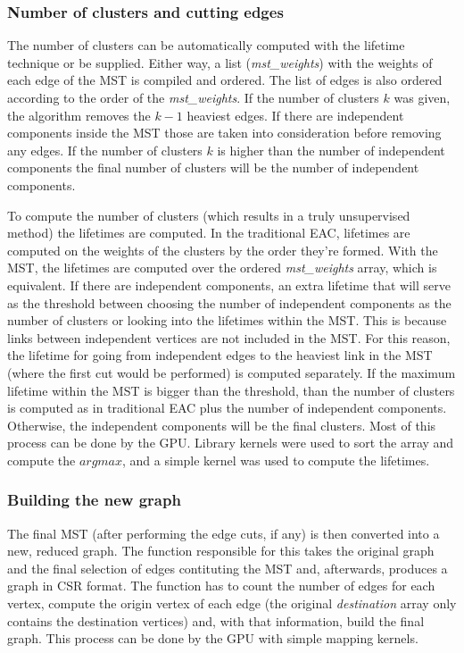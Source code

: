 \subsubsection{Number of clusters and cutting edges}
The number of clusters can be automatically computed with the lifetime technique or be supplied. 
Either way, a list (\emph{mst\_weights}) with the weights of each edge of the MST is compiled and ordered.
The list of edges is also ordered according to the order of the \emph{mst\_weights}. 
If the number of clusters $k$ was given, the algorithm removes the $k - 1$ heaviest edges. 
If there are independent components inside the MST those are taken into consideration before removing any edges.
If the number of clusters $k$ is higher than the number of independent components the final number of clusters will be the number of independent components.

To compute the number of clusters (which results in a truly unsupervised method) the lifetimes are computed.
In the traditional EAC, lifetimes are computed on the weights of the clusters by the order they're formed.
With the MST, the lifetimes are computed over the ordered \emph{mst\_weights} array, which is equivalent.
If there are independent components, an extra lifetime that will serve as the threshold between choosing the number of independent components as the number of clusters or looking into the lifetimes within the MST.
This is because links between independent vertices are not included in the MST.
For this reason, the lifetime for going from independent edges to the heaviest link in the MST (where the first cut would be performed) is computed separately.
If the maximum lifetime within the MST is bigger than the threshold, than the number of clusters is computed as in traditional EAC plus the number of independent components.
Otherwise, the independent components will be the final clusters.
Most of this process can be done by the GPU.
Library kernels were used to sort the array and compute the $arg max$, and a simple kernel was used to compute the lifetimes.

\subsubsection{Building the new graph}
The final MST (after performing the edge cuts, if any) is then converted into a new, reduced graph.
The function responsible for this takes the original graph and the final selection of edges contituting the MST and, afterwards, produces a graph in CSR format.
The function has to count the number of edges for each vertex, compute the origin vertex of each edge (the original \emph{destination} array only contains the destination vertices) and, with that information, build the final graph.
This process can be done by the GPU with simple mapping kernels.

